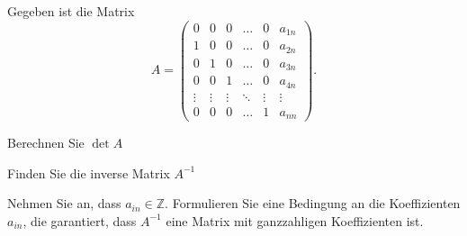 Gegeben ist die Matrix
\[
A
=
\begin{pmatrix}
0&0&0&\dots&0&a_{1n}\\
1&0&0&\dots&0&a_{2n}\\
0&1&0&\dots&0&a_{3n}\\
0&0&1&\dots&0&a_{4n}\\
\vdots&\vdots&\vdots&\ddots&\vdots&\vdots\\
0&0&0&\dots&1&a_{nn}
\end{pmatrix}.
\]
\begin{teilaufgaben}
\item Berechnen Sie $\det A$
\item Finden Sie die inverse Matrix $A^{-1}$
\item Nehmen Sie an, dass $a_{in}\in\mathbb{Z}$.
Formulieren Sie eine Bedingung an die Koeffizienten $a_{in}$, die garantiert,
dass $A^{-1}$ eine Matrix mit ganzzahligen Koeffizienten ist.
\end{teilaufgaben}

